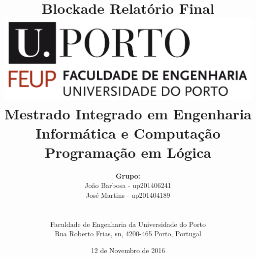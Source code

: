 \documentclass[a4paper]{article}
\begin{document}
\setlength{\textwidth}{16cm}
\setlength{\textheight}{22cm}

\title{\Huge\textbf{Blockade}\linebreak\linebreak\linebreak
\Large\textbf{Relatório Final}\linebreak\linebreak
\linebreak\linebreak
\includegraphics[scale=0.1]{feup-logo.png}\linebreak\linebreak
\linebreak\linebreak
\Large{Mestrado Integrado em Engenharia Informática e Computação} \linebreak\linebreak
\Large{Programação em Lógica}\linebreak
}

\author{\textbf{Grupo:}\\  João Barbosa - up201406241 \\ José Martins - up201404189 \\\linebreak\linebreak \\
 \\ Faculdade de Engenharia da Universidade do Porto \\ Rua Roberto Frias, s\/n, 4200-465 Porto, Portugal 
\vspace{1cm}}
\date{12 de Novembro de 2016}
\maketitle
\thispagestyle{empty}


\newpage
\end{document}
